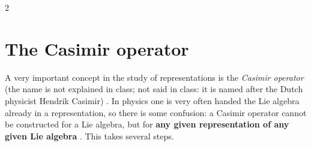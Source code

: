 \begin{paracol}{2}
\section{The Casimir operator}\label{sec:rp-casimir}

A very important concept in the study of representations is the \emph{Casimir operator} (the name is not explained in class; not said in class: it is named after the Dutch physicist Hendrik Casimir) . In physics one is very often handed the Lie algebra already in a representation, so there is some confusion: a Casimir operator cannot be constructed for a Lie algebra, but for \textbf{any given representation of any given Lie algebra}  . This takes several steps.


\end{paracol}
